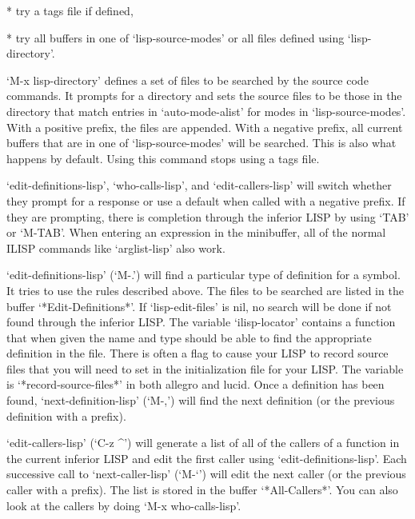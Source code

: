    * try a tags file if defined,

   * try all buffers in one of `lisp-source-modes' or all files defined
     using `lisp-directory'.

   `M-x lisp-directory' defines a set of files to be searched by the
source code commands.  It prompts for a directory and sets the source
files to be those in the directory that match entries in
`auto-mode-alist' for modes in `lisp-source-modes'.  With a positive
prefix, the files are appended.  With a negative prefix, all current
buffers that are in one of `lisp-source-modes' will be searched.  This
is also what happens by default.  Using this command stops using a tags
file.

\shortsubsection{}

`edit-definitions-lisp', `who-calls-lisp', and `edit-callers-lisp'
will switch whether they prompt for a response or use a default when
called with a negative prefix.  If they are prompting, there is
completion through the inferior LISP by using `TAB' or `M-TAB'.  When
entering an expression in the minibuffer, all of the normal ILISP
commands like `arglist-lisp' also work.

\shortsubsection{}

`edit-definitions-lisp' (`M-.') will find a particular type of
definition for a symbol.  It tries to use the rules described above.
The files to be searched are listed in the buffer `*Edit-Definitions*'.
If `lisp-edit-files' is nil, no search will be done if not found
through the inferior LISP.  The variable `ilisp-locator' contains a
function that when given the name and type should be able to find the
appropriate definition in the file.  There is often a flag to cause
your LISP to record source files that you will need to set in the
initialization file for your LISP.  The variable is
`*record-source-files*' in both allegro and lucid.  Once a definition
has been found, `next-definition-lisp' (`M-,') will find the next
definition (or the previous definition with a prefix).

\shortsubsection{}

`edit-callers-lisp' (`C-z ^') will generate a list of all of the
callers of a function in the current inferior LISP and edit the first
caller using `edit-definitions-lisp'.  Each successive call to
`next-caller-lisp' (`M-`') will edit the next caller (or the previous
caller with a prefix).  The list is stored in the buffer
`*All-Callers*'.  You can also look at the callers by doing `M-x
who-calls-lisp'.

